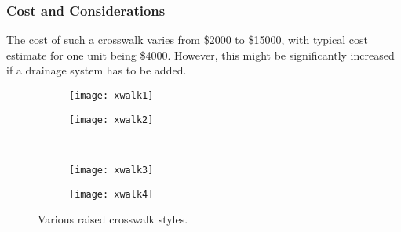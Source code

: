 \subsubsection{Cost and Considerations}

The cost of such a crosswalk varies from \$2000 to \$15000, with typical cost estimate for one unit being \$4000\cite{traffic-calming-xwalks}. However, this might be significantly increased if a drainage system has to be added.

\begin{figure}[!htbp]
\centering
\begin{subfigure}[t]{0.45\textwidth}
	\texttt{[image: xwalk1]}
\end{subfigure}
\begin{subfigure}[t]{0.45\textwidth}
	\texttt{[image: xwalk2]}
\end{subfigure}\\
\begin{subfigure}[t]{0.45\textwidth}
	\texttt{[image: xwalk3]}
\end{subfigure}
\begin{subfigure}[t]{0.45\textwidth}
	\texttt{[image: xwalk4]}
\end{subfigure}
\caption[Various raised crosswalk styles]{Various raised crosswalk styles.\cite{traffic-calming-xwalks}}
\end{figure}

\newpage